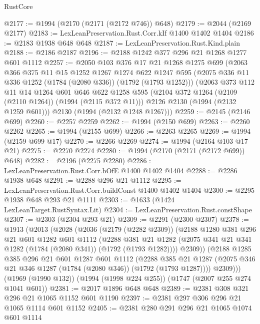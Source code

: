 \begin{lexlean}{RustCore}
\begin{coremodule}
@2177 := @1994 (@2170 (@2171 (@2172 @746)) @648)
@2179 := @2044 (@2169 @2177)
@2183 := LexLeanPreservation.Rust.Corr.kIf @1400 @1402 @1404
@2186 := @2183 @1938 @648 @648
@2187 := LexLeanPreservation.Rust.Kind.plain
@2188 := @2186 @2187
@2196 := @2188 @1242 @377 @296 @21 @1268 @1277 @601 @1112
@2257 := @2050
    @103
    @376
    @17
    @21
    @1268
    @1275
    @699
    (@2063
      @366
      @375
      @11
      @15
      @1252
      @1267
      @1274
      @622
      @1247
      @595
      (@2075 @336 @11 @336 @1252 (@1784 (@2080 @336)) (@1792 (@1793 @1252)))
      (@2063
        @373
        @112
        @11
        @14
        @1264
        @601
        @646
        @622
        @1258
        @595
        (@2104 @372 @1264 (@2109 (@2110 @1264)) (@1994 (@2115 @372 @11)))
        @2126
        @2130
        (@1994 (@2132 @1259 @601)))
      @2130
      (@1994 (@2132 @1248 @1267)))
@2259 := @2145 (@2146 @699)
@2260 := @2257 @2259
@2262 := @1994 (@2150 @699)
@2263 := @2260 @2262
@2265 := @1994 (@2155 @699)
@2266 := @2263 @2265
@2269 := @1994 (@2159 @699 @17)
@2270 := @2266 @2269
@2274 := @1994 (@2164 @103 @17 @21)
@2275 := @2270 @2274
@2280 := @1994 (@2170 (@2171 (@2172 @699)) @648)
@2282 := @2196 (@2275 @2280)
@2286 := LexLeanPreservation.Rust.Corr.bOfE @1400 @1402 @1404
@2288 := @2286 @1938 @648
@2291 := @2288 @296 @21 @1112
@2295 := LexLeanPreservation.Rust.Corr.buildConst @1400 @1402 @1404
@2300 := @2295 @1938 @648 @293 @21 @1111
@2303 := @1633 (@1424 LexLeanTarget.RustSyntax.Lit)
@2304 := LexLeanPreservation.Rust.constShape
@2307 := @2303 (@2304 @293 @21)
@2309 := @2291 (@2300 @2307)
@2378 := @1913
    (@2013
      (@2028
        (@2036
          (@2179 (@2282 @2309))
          (@2188
            @1280
            @381
            @296
            @21
            @601
            @1282
            @601
            @1112
            (@2288
              @381
              @21
              @1282
              (@2075 @341 @21 @341 @1282 (@1784 (@2080 @341)) (@1792 (@1793 @1282))))
            @2309))
        (@2188
          @1285
          @385
          @296
          @21
          @601
          @1287
          @601
          @1112
          (@2288
            @385
            @21
            @1287
            (@2075 @346 @21 @346 @1287 (@1784 (@2080 @346)) (@1792 (@1793 @1287))))
          @2309)))
    (@1969 (@1990 @132))
    (@1994 (@1998 @224 @255))
    (@1747 (@2007 @255 @274 @1041 @601))
@2381 := @2017 @1896 @648 @648
@2389 := @2381 @308 @321 @296 @21 @1065 @1152 @601 @1190
@2397 := @2381 @297 @306 @296 @21 @1065 @1114 @601 @1152
@2405 := @2381 @280 @291 @296 @21 @1065 @1074 @601 @1114

\end{coremodule}
\end{lexlean}
